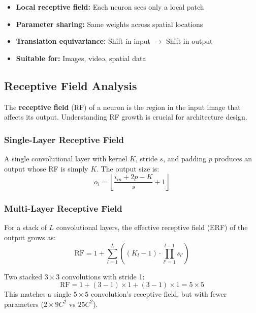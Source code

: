 \begin{properties}
\begin{itemize}
    \item \textbf{Local receptive field:} Each neuron sees only a local patch
    \item \textbf{Parameter sharing:} Same weights across spatial locations
    \item \textbf{Translation equivariance:} Shift in input $\rightarrow$ Shift in output
    \item \textbf{Suitable for:} Images, video, spatial data
\end{itemize}
\end{properties}

\subsection{Receptive Field Analysis}

The \textbf{receptive field} (RF) of a neuron is the region in the input image that affects its output. Understanding RF growth is crucial for architecture design.

\subsubsection{Single-Layer Receptive Field}

A single convolutional layer with kernel $K$, stride $s$, and padding $p$ produces an output whose RF is simply $K$. The output size is:
\begin{equation}
o_i = \left\lfloor \frac{i_{in} + 2p - K}{s} + 1 \right\rfloor
\end{equation}

\subsubsection{Multi-Layer Receptive Field}

For a stack of $L$ convolutional layers, the effective receptive field (ERF) of the output grows as:
\begin{equation}
\text{RF} = 1 + \sum_{l=1}^{L} \left( (K_l - 1) \cdot \prod_{l'=1}^{l-1} s_{l'} \right)
\end{equation}

\begin{example}
Two stacked $3 \times 3$ convolutions with stride 1:
\begin{equation}
\text{RF} = 1 + (3 - 1) \times 1 + (3 - 1) \times 1 = 5 \times 5
\end{equation}
This matches a single $5 \times 5$ convolution's receptive field, but with fewer parameters ($2 \times 9C^2$ vs $25C^2$).
\end{example}

